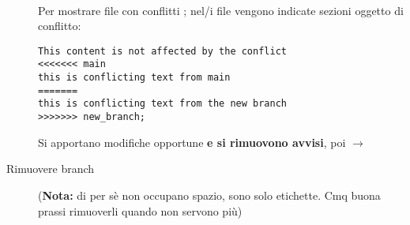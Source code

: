 \documentclass[10pt, oneside]{Book}
\begin{document}
\begin{description}
\\Per mostrare file con conflitti ;
nel/i file vengono indicate sezioni oggetto di conflitto:
\begin{verbatim}
This content is not affected by the conflict
<<<<<<< main
this is conflicting text from main
=======
this is conflicting text from the new branch
>>>>>>> new_branch;
\end{verbatim}
Si apportano modifiche opportune \textbf{e si rimuovono avvisi}, poi  $\rightarrow$ 
\item[Rimuovere branch]  (\textbf{Nota:} di per sè non occupano spazio, sono solo etichette. Cmq buona prassi rimuoverli quando non servono più)
\end{description}
\end{document}
